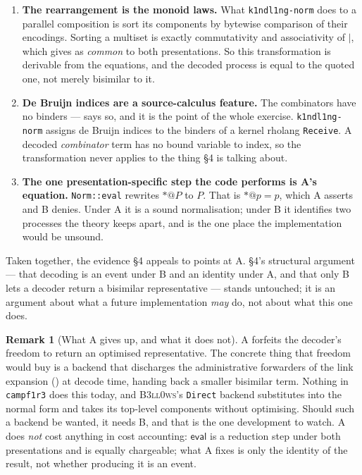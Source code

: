 \documentclass[11pt,a4paper]{article}
\makeatletter
\newcommand{\code}[1]{\texttt{#1}}
\newcommand{\Bell}{\textsc{B3ll0ws}}
\newcommand{\quo}[1]{@#1}
\newcommand{\drp}[1]{{*}#1}
\theoremstyle{definition}
\newtheorem{remark}[definition]{Remark}
\theoremstyle{plain}
\makeatother
\begin{document}
\begin{enumerate}[leftmargin=1.8em]
\item \textbf{The rearrangement is the monoid laws.} What
\code{k1ndl1ng-norm} does to a parallel composition is sort its components by
bytewise comparison of their encodings. Sorting a multiset is exactly
commutativity and associativity of $\mid$, which \cite[Def.~3.1]{draft3} gives
as \emph{common} to both presentations. So this transformation is derivable
from the equations, and the decoded process is equal to the quoted one, not
merely bisimilar to it.

\item \textbf{De Bruijn indices are a source-calculus feature.} The
combinators have no binders --- \cite[Def.~3.1]{draft3} says so, and it is the
point of the whole exercise. \code{k1ndl1ng-norm} assigns de Bruijn indices to
the binders of a kernel rholang \code{Receive}. A decoded \emph{combinator}
term has no bound variable to index, so the transformation never applies to
the thing \S4 is talking about.

\item \textbf{The one presentation-specific step the code performs is A's
equation.} \code{Norm::eval} rewrites $\drp{\quo{P}}$ to $P$. That is
$\drp{\quo{p}} = p$, which A asserts and B denies. Under A it is a sound
normalisation; under B it identifies two processes the theory keeps apart, and
is the one place the implementation would be unsound.
\end{enumerate}

\noindent
Taken together, the evidence \S4 appeals to points at A. \S4's structural
argument --- that decoding is an event under B and an identity under A, and
that only B lets a decoder return a bisimilar representative --- stands
untouched; it is an argument about what a future implementation \emph{may}
do, not about what this one does.

\begin{remark}[What A gives up, and what it does not]
\label{rem:whatAcosts}
A forfeits the decoder's freedom to return an optimised representative. The
concrete thing that freedom would buy is a backend that discharges the
administrative forwarders of the link expansion (\cite[Lem.~7.4]{draft3}) at
decode time, handing back a smaller bisimilar term. Nothing in \code{campf1r3}
does this today, and \Bell's \code{Direct} backend substitutes into the normal
form and takes its top-level components without optimising. Should such a
backend be wanted, it needs B, and that is the one development to watch. A
does \emph{not} cost anything in cost accounting: $\mathsf{eval}$ is a
reduction step under both presentations and is equally chargeable; what A
fixes is only the identity of the result, not whether producing it is an
event.
\end{remark}
\end{document}
